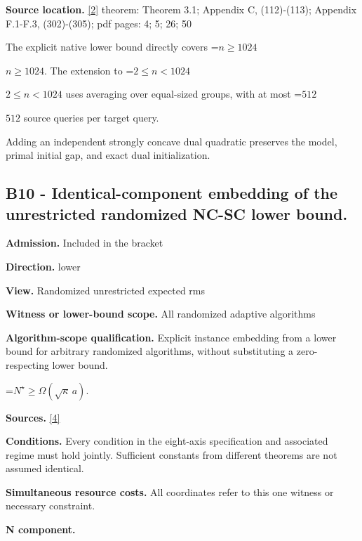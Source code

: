 \documentclass[10pt,a4paper]{article}
\newcommand{\AtlasMath}[1]{\par\begingroup\centering\setbox0=\hbox{$\displaystyle #1$}\ifdim\wd0>1.4\linewidth\typeout{ATLAS WIDE FORMULA: \the\wd0}\fi\ifdim\wd0>\linewidth\resizebox{\linewidth}{!}{\box0}\else\box0\fi\par\endgroup}
\newcommand{\AtlasInlineMath}[1]{\begingroup\setbox0=\hbox{$#1$}\ifdim\wd0>.4\linewidth\endgroup\AtlasMath{#1}\else\endgroup$#1$\fi}
\begin{document}
\textbf{Source location.} \href{https://arxiv.org/pdf/2609.00045v3}{[2]} theorem: Theorem 3.1; Appendix C, (112)-(113); Appendix F.1-F.3, (302)-(305); pdf pages: 4; 5; 26; 50



The explicit native lower bound directly covers \AtlasInlineMath{n\ge1024}. The extension to \AtlasInlineMath{2\le n<1024} uses averaging over equal-sized groups, with at most \AtlasInlineMath{512} source queries per target query.



Adding an independent strongly concave dual quadratic preserves the model, primal initial gap, and exact dual initialization.



\subsection{B10 - Identical-component embedding of the unrestricted randomized NC-SC lower bound.}


\textbf{Admission.} Included in the bracket



\textbf{Direction.} lower



\textbf{View.} Randomized unrestricted expected rms



\textbf{Witness or lower-bound scope.} All randomized adaptive algorithms



\textbf{Algorithm-scope qualification.} Explicit instance embedding from a lower bound for arbitrary randomized algorithms, without substituting a zero-respecting lower bound.



\AtlasMath{N^\star\ge\Omega(\sqrt\kappa\,a).}


\textbf{Sources.} \href{https://arxiv.org/pdf/2610.00229v2}{[4]}



\textbf{Conditions.} Every condition in the eight-axis specification and associated regime must hold jointly. Sufficient constants from different theorems are not assumed identical.



\textbf{Simultaneous resource costs.} All coordinates refer to this one witness or necessary constraint.



\textbf{N component.}
\end{document}
